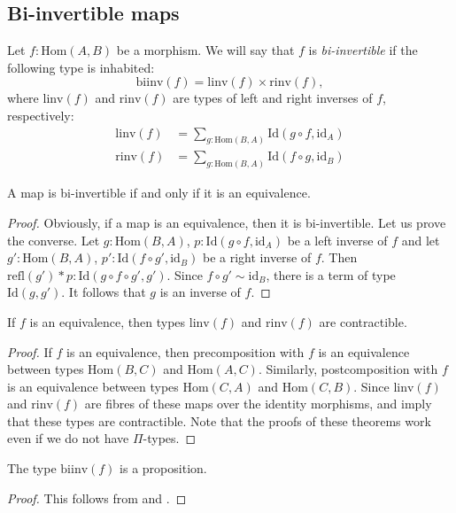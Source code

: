 \documentclass[reqno]{amsart}
\theoremstyle{definition}
\theoremstyle{remark}
\newcommand{\fs}[1]{\mathrm{#1}}
\newcommand{\Hom}{\fs{Hom}}
\newcommand{\Id}{\fs{Id}}
\newcommand{\refl}{\fs{refl}}
\newcommand{\id}{\fs{id}}
\numberwithin{figure}{section}
\begin{document}
\subsection{Bi-invertible maps}

Let $f : \Hom(A,B)$ be a morphism.
We will say that $f$ is \emph{bi-invertible} if the following type is inhabited:
\[ \fs{biinv}(f) = \fs{linv}(f) \times \fs{rinv}(f), \]
where $\fs{linv}(f)$ and $\fs{rinv}(f)$ are types of left and right inverses of $f$, respectively:
\begin{align*}
\fs{linv}(f) & = \sum_{g : \Hom(B,A)} \Id(g \circ f, \id_A) \\
\fs{rinv}(f) & = \sum_{g : \Hom(B,A)} \Id(f \circ g, \id_B)
\end{align*}

\begin{prop}
A map is bi-invertible if and only if it is an equivalence.
\end{prop}
\begin{proof}
Obviously, if a map is an equivalence, then it is bi-invertible.
Let us prove the converse.
Let $g : \Hom(B,A)$, $p : \Id(g \circ f, \id_A)$ be a left inverse of $f$ and let $g' : \Hom(B,A)$, $p' : \Id(f \circ g', \id_B)$ be a right inverse of $f$.
Then $\refl(g') * p : \Id(g \circ f \circ g', g')$.
Since $f \circ g' \sim \id_B$, there is a term of type $\Id(g,g')$.
It follows that $g$ is an inverse of $f$.
\end{proof}

\begin{lem}
If $f$ is an equivalence, then types $\fs{linv}(f)$ and $\fs{rinv}(f)$ are contractible.
\end{lem}
\begin{proof}
If $f$ is an equivalence, then precomposition with $f$ is an equivalence between types $\Hom(B,C)$ and $\Hom(A,C)$.
Similarly, postcomposition with $f$ is an equivalence between types $\Hom(C,A)$ and $\Hom(C,B)$.
Since $\fs{linv}(f)$ and $\fs{rinv}(f)$ are fibres of these maps over the identity morphisms, \cite[Theorem~4.2.3]{hottbook} and \cite[Theorem~4.2.6]{hottbook} imply that these types are contractible.
Note that the proofs of these theorems work even if we do not have $\Pi$-types.
\end{proof}

\begin{prop}
The type $\fs{biinv}(f)$ is a proposition.
\end{prop}
\begin{proof}
This follows from  and .
\end{proof}
\end{document}
